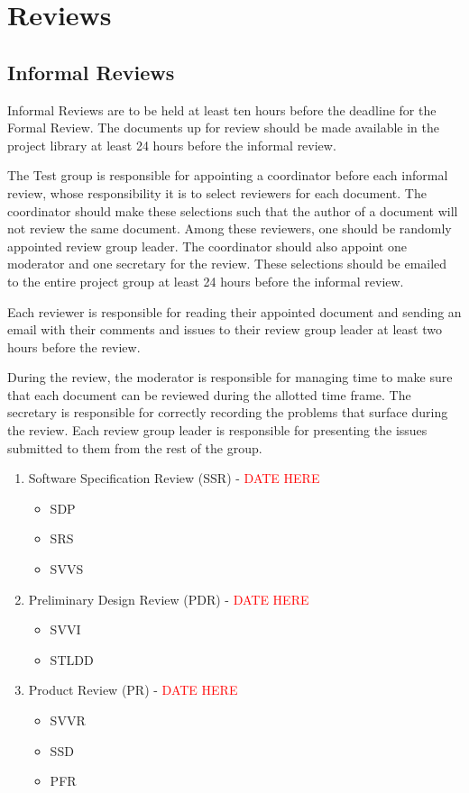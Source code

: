 \documentclass[a4paper]{article}
\begin{document}
\section{Reviews}

\subsection{Informal Reviews}
Informal Reviews are to be held at least ten hours before the deadline for the Formal Review. The documents up for review should be made available in the project library at least 24 hours before the informal review.

The Test group is responsible for appointing a coordinator before each informal review, whose responsibility it is to select reviewers for each document. The coordinator should make these selections such that the author of a document will not review the same document. Among these reviewers, one should be randomly appointed review group leader. The coordinator should also appoint one moderator and one secretary for the review. These selections should be emailed to the entire project group at least 24 hours before the informal review.

Each reviewer is responsible for reading their appointed document and sending an email with their comments and issues to their review group leader at least two hours before the review.

During the review, the moderator is responsible for managing time to make sure that each document can be reviewed during the allotted time frame. The secretary is responsible for correctly recording the problems that surface during the review. Each review group leader is responsible for presenting the issues submitted to them from the rest of the group.

\begin{enumerate}


\item Software Specification Review (SSR) - \textcolor{red}{DATE HERE}
\begin{itemize}
\item SDP
\item SRS
\item SVVS
\end{itemize}


\item Preliminary Design Review (PDR) - \textcolor{red}{DATE HERE}
\begin{itemize}
\item SVVI
\item STLDD
\end{itemize}


\item Product Review (PR) - \textcolor{red}{DATE HERE}
\begin{itemize}
\item SVVR
\item SSD
\item PFR
\end{itemize}


\end{enumerate}
\end{document}
